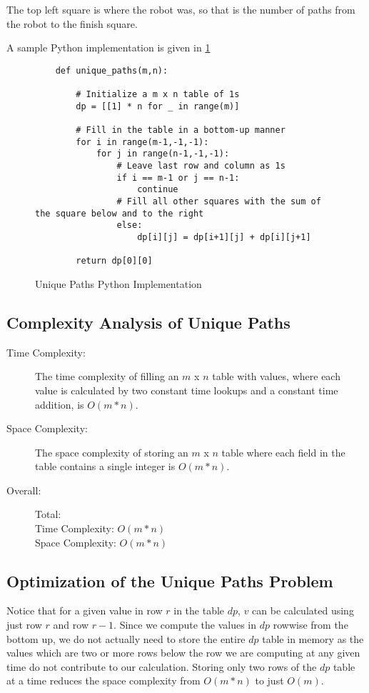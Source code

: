 The top left square is where the robot was, so that is the number of paths from the robot to the finish square.

A sample Python implementation is given in \ref{fig:unique-paths}
\begin{figure}[H]
    \centering
    \begin{lstlisting}
    def unique_paths(m,n):
    
        # Initialize a m x n table of 1s
        dp = [[1] * n for _ in range(m)]
    
        # Fill in the table in a bottom-up manner
        for i in range(m-1,-1,-1):
            for j in range(n-1,-1,-1):
                # Leave last row and column as 1s
                if i == m-1 or j == n-1:
                    continue
                # Fill all other squares with the sum of the square below and to the right
                else:
                    dp[i][j] = dp[i+1][j] + dp[i][j+1]

        return dp[0][0]
    \end{lstlisting}
    \caption{Unique Paths Python Implementation}
    \label{fig:unique-paths}
\end{figure}

\subsection{Complexity Analysis of Unique Paths}\label{ca-unique-paths}

\begin{description}
    \item[Time Complexity:]
        The time complexity of filling an $m$ x $n$ table with values,
        where each value is calculated by two constant time lookups and a constant time addition, is $O(m * n)$.
        
    \item[Space Complexity:] 
        The space complexity of storing an $m$ x $n$ table where each field in the table contains a single integer is $O(m * n)$.

    \item[Overall:] Total:\\
        Time Complexity: $O(m * n)$\\
        Space Complexity: $O(m * n)$
    
\end{description}
\newpage

\subsection{Optimization of the Unique Paths Problem}
Notice that for a given value in row $r$ in the table $dp$, $v$ can be calculated using just row $r$ and row $r-1$.
Since we compute the values in $dp$ rowwise from the bottom up, we do not actually need to store the entire $dp$ table in memory as the values which are two or more rows below the row we are computing at any given time do not contribute to our calculation.
Storing only two rows of the $dp$ table at a time reduces the space complexity from $O(m * n)$ to just $O(m)$.\\

